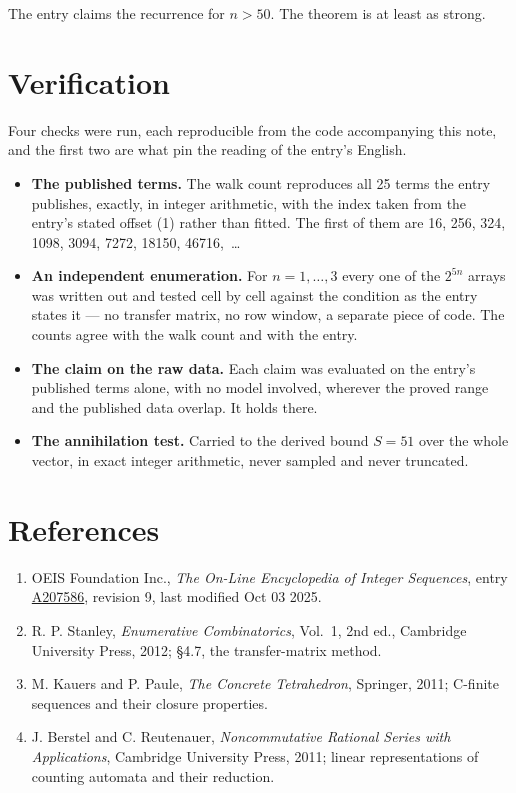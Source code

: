 \documentclass[11pt]{article}
\theoremstyle{definition}
\begin{document}
The entry claims the recurrence for $n > 50$. The theorem is at least as strong.

\section{Verification}

Four checks were run, each reproducible from the code accompanying this note, and the first two are what pin the reading of the entry's English.

\begin{itemize}

\item {\bfseries The published terms.} The walk count reproduces all 25 terms the entry publishes, exactly, in integer arithmetic, with the index taken from the entry's stated offset (1) rather than fitted. The first of them are 16, 256, 324, 1098, 3094, 7272, 18150, 46716,~\dots

\item {\bfseries An independent enumeration.} For $n = 1,\dots,3$ every one of the $2^{5n}$ arrays was written out and tested cell by cell against the condition as the entry states it --- no transfer matrix, no row window, a separate piece of code. The counts agree with the walk count and with the entry.

\item {\bfseries The claim on the raw data.} Each claim was evaluated on the entry's published terms alone, with no model involved, wherever the proved range and the published data overlap. It holds there.

\item {\bfseries The annihilation test.} Carried to the derived bound $S = 51$ over the whole vector, in exact integer arithmetic, never sampled and never truncated.

\end{itemize}

\section{References}

\begin{enumerate}

\item OEIS Foundation Inc., \emph{The On-Line Encyclopedia of Integer Sequences}, entry \href{https://oeis.org/A207586}{A207586}, revision 9, last modified Oct 03 2025.

\item R. P. Stanley, \emph{Enumerative Combinatorics}, Vol.~1, 2nd ed., Cambridge University Press, 2012; \S4.7, the transfer-matrix method.

\item M. Kauers and P. Paule, \emph{The Concrete Tetrahedron}, Springer, 2011; C-finite sequences and their closure properties.

\item J. Berstel and C. Reutenauer, \emph{Noncommutative Rational Series with Applications}, Cambridge University Press, 2011; linear representations of counting automata and their reduction.

\end{enumerate}
\end{document}
